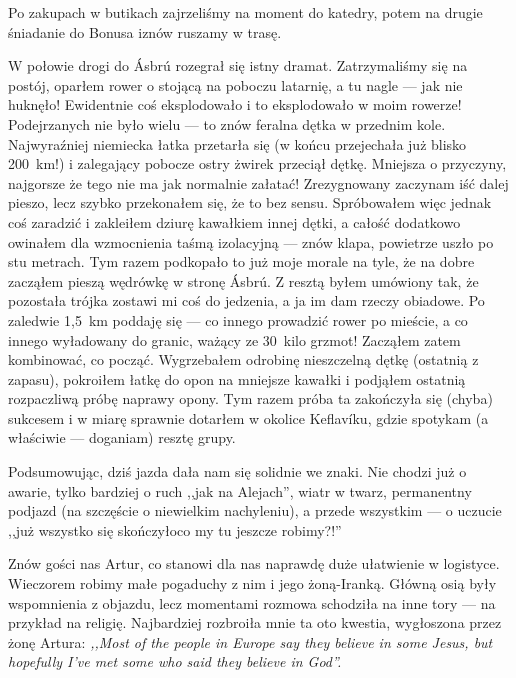 Po zakupach w butikach zajrzeliśmy na moment do katedry, potem na drugie śniadanie do Bonusa i\textellipsis znów ruszamy w trasę.

W połowie drogi do Ásbrú rozegrał się istny dramat. Zatrzymaliśmy się na postój, oparłem rower o stojącą na poboczu latarnię, a tu nagle --- jak nie huknęło! Ewidentnie coś eksplodowało i to eksplodowało w moim rowerze! Podejrzanych nie było wielu --- to znów feralna dętka w przednim kole. Najwyraźniej niemiecka łatka przetarła się (w końcu przejechała już blisko 200~km!) i zalegający pobocze ostry żwirek przeciął dętkę. Mniejsza o przyczyny, najgorsze że tego nie ma jak normalnie załatać! Zrezygnowany zaczynam iść dalej pieszo, lecz szybko przekonałem się, że to bez sensu. Spróbowałem więc jednak coś zaradzić i zakleiłem dziurę kawałkiem innej dętki, a całość dodatkowo owinałem dla wzmocnienia taśmą izolacyjną --- znów klapa, powietrze uszło po stu metrach. Tym razem podkopało to już moje morale na tyle, że na dobre zacząłem pieszą wędrówkę w stronę Ásbrú. Z resztą byłem umówiony tak, że pozostała trójka zostawi mi coś do jedzenia, a ja im dam rzeczy obiadowe. Po zaledwie 1,5~km poddaję się --- co innego prowadzić rower po mieście, a co innego wyładowany do granic, ważący ze 30~kilo grzmot! Zacząłem zatem kombinować, co począć. Wygrzebałem odrobinę nieszczelną dętkę (ostatnią z zapasu), pokroiłem łatkę do opon na mniejsze kawałki i podjąłem ostatnią rozpaczliwą próbę naprawy opony. Tym razem próba ta zakończyła się (chyba) sukcesem i w miarę sprawnie dotarłem w okolice Keflavíku, gdzie spotykam (a właściwie --- doganiam) resztę grupy.

Podsumowując, dziś jazda dała nam się solidnie we znaki. Nie chodzi już o awarie, tylko bardziej o ruch ,,jak na Alejach'', wiatr w twarz, permanentny podjazd (na szczęście o niewielkim nachyleniu), a przede wszystkim --- o uczucie ,,już wszystko się skończyło\textellipsis co my tu jeszcze robimy?!''

Znów gości nas Artur, co stanowi dla nas naprawdę duże ułatwienie w logistyce. Wieczorem robimy małe pogaduchy z nim i jego żoną-Iranką. Główną osią były wspomnienia z objazdu, lecz momentami rozmowa schodziła na inne tory --- na przykład na religię. Najbardziej rozbroiła mnie ta oto kwestia, wygłoszona przez żonę Artura: \emph{,,Most of the people in Europe say they believe in some Jesus, but hopefully I’ve met some who said they believe in God''.}

\pagebreak


